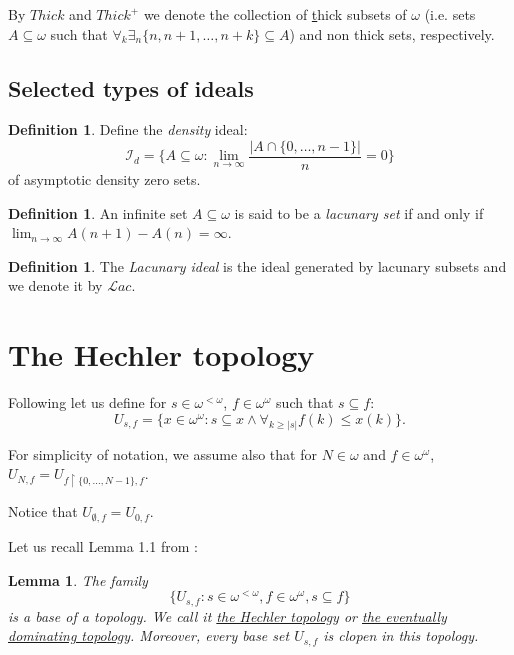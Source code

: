 \documentclass[12pt]{amsart}
\theoremstyle{plain}
\newtheorem{lemma}[theorem]{Lemma}
\theoremstyle{definition}
\newtheorem{definition}[theorem]{Definition}
\theoremstyle{remark}
\newcommand{\baire}{\omega^{\omega}}
\newcommand{\finbaire}{\omega^{<\omega}}
\newcommand{\idealGestosciowy}{\mathcal{I}_d}
\newcommand{\idealLacunary}{\mathcal{L}\mathit{ac}}
\newcommand{\Thick}{{\mathit Thick}}
\newcommand{\ThickPlus}{{\Thick}^+}
\newcommand{\Hechler}[2]{U_{#1,#2}}
\begin{document}
By $\Thick$ and $\ThickPlus$ we denote the collection of {\underline thick}
subsets of $\omega$ (i.e. sets $A \subseteq \omega$ such that
$\forall_{k} \exists_{n} \lbrace n, n + 1, \ldots, n + k\rbrace \subseteq A$)
and non thick sets, respectively.

\subsection{Selected types of ideals}

\begin{definition}\label{definition:density-ideal}
  Define the {\it density} ideal:
  \[\idealGestosciowy
    = \lbrace A \subseteq\omega\colon \lim_{n\to\infty} \frac{|A\cap\lbrace 0,\ldots, n-1\rbrace|}{n} = 0 \rbrace
  \]
  of asymptotic density zero sets.
\end{definition}

\begin{definition}\label{definition:lacunary-set}%
An infinite set $A \subseteq\omega$ is said to be a {\it lacunary set} if and only if
$\lim_{n\to\infty} A(n+1) - A(n) = \infty$. 
\end{definition}
\begin{definition}\label{definition:ideal-lacunary}%
The {\it Lacunary ideal} is the ideal generated by lacunary subsets
and we denote it by $\idealLacunary$.
\end{definition}

\section{The Hechler topology}

Following \cite{LabedzkiRepicky1995} let us define for $s \in \finbaire$,
$f \in \baire$ such that $s \subseteq f$:
\[
  \Hechler{s}{f} = \lbrace x \in \baire\colon s \subseteq x \wedge \forall_{k \geq |s|} f(k) \leq x(k)\rbrace.
\]

For simplicity of notation, we assume also that for
$N \in \omega$ and $f \in \baire$,
$\Hechler{N}{f} = \Hechler{f \restriction \lbrace 0, \ldots, N - 1 \rbrace}{f}$.

Notice that $\Hechler{\emptyset}{f} = \Hechler{0}{f}$.

Let us recall Lemma 1.1 from \cite{LabedzkiRepicky1995}:
\begin{lemma}
  The family
  \[\lbrace \Hechler{s}{f} \colon s \in \finbaire,
    f \in \baire, s \subseteq f\rbrace\]
  is a base of a topology.
  We call it \underline{the Hechler topology} or \underline{the eventually dominating topology}.
  Moreover, every base set $\Hechler{s}{f}$ is clopen in this topology.
\end{lemma}
\end{document}
